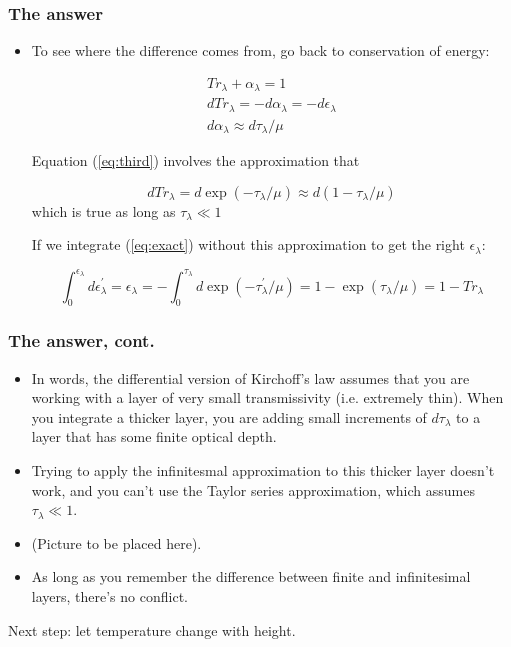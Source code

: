 \documentclass[hyperref={colorlinks=true,linkcolor=blue,urlcolor=blue},numbers]{beamer}
\begin{document}
\begin{frame}
  \frametitle{ The answer}

  \begin{itemize}
  \item To see where the difference comes from, go back to conservation of energy:

    \begin{gather}
        Tr_\lambda + \alpha_\lambda =1 \\
  dTr_\lambda = - d\alpha_\lambda = - d\epsilon_\lambda \label{eq:exact}\\
  d\alpha_\lambda \approx d\tau_\lambda/\mu \label{eq:third}
    \end{gather}

Equation (\ref{eq:third}) involves the approximation that 

\begin{equation*}
    d Tr_\lambda = d \exp(-\tau_\lambda/\mu) \approx  d(1 -\tau_\lambda/\mu)
\end{equation*}
which is true as long as $\tau_\lambda \ll 1$

 If we integrate (\ref{eq:exact}) without this approximation to get the right $\epsilon_\lambda$:

\begin{equation*}
\int_0^{\epsilon_\lambda} d\epsilon_\lambda^\prime = \epsilon_\lambda =
-\int_0^{\tau_\lambda}    d \exp(-\tau^\prime _\lambda/\mu)  = 1 - \exp(\tau_\lambda/\mu) = 1 - Tr_\lambda
\end{equation*}


  \end{itemize}
\end{frame}
\begin{frame}
  \frametitle{ The answer, cont.}

  \begin{itemize}

  \item In words, the differential version of Kirchoff's law assumes that you are working with
a layer of very small transmissivity (i.e. extremely thin).   When you integrate
a thicker layer, you are adding small increments of $d \tau_\lambda$ to a layer
that has some finite optical depth.

\item   Trying to apply the infinitesmal approximation
to this thicker layer doesn't work, 
and you can't use the Taylor series approximation, which assumes
$\tau_\lambda \ll 1$.  


\item  (Picture to be placed here).


\item As long as you remember the difference between finite and infinitesimal layers, there's
no conflict.

  \end{itemize}


Next step: let temperature change with height.

\end{frame}
\end{document}
